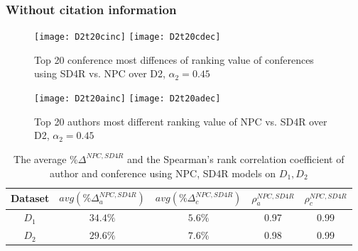 \documentclass[10pt,leqno,twoside]{article}
\begin{document}
\subsubsection{Without citation information}
\begin{figure} %
	\caption{Top 20 conference most diffences of ranking value of conferences using SD4R vs. NPC over D2, $\alpha_2=0.45$}
	\label{Fig:Top20IncDecConference}
    \centering
    \texttt{[image: D2t20cinc]}
     \texttt{[image: D2t20cdec]}
\end{figure}
%
\begin{figure} %
	\caption{Top 20 authors most different ranking value of NPC vs. SD4R over D2, $\alpha_2=0.45$}
	\label{Fig:Top20IncDecAuthor}
    \centering
    \texttt{[image: D2t20ainc]}
    \texttt{[image: D2t20adec]}
\end{figure}
%
\begin{table}
\begin{center}
\caption{The average $\%\Delta^{NPC,SD4R}$ and the Spearman's rank correlation coefficient of author and conference using NPC, SD4R models on $D_1, D_2$}
\label{fig:deltaresult}
{\scriptsize
\begin{tabular}{|c|c|c|c|c|}
\hline
Dataset	& $avg(\%\Delta^{NPC,SD4R}_a)$ & $avg(\%\Delta^{NPC,SD4R}_c)$ & $\rho^{NPC,SD4R}_a$ & $\rho^{NPC,SD4R}_c$ \\
\hline\hline
$D_1$ &	$34.4\%$ & $5.6\%$ & 0.97 & 0.99 \\
$D_2$ & $29.6\%$ & $7.6\%$ & 0.98 & 0.99 \\
\hline
\end{tabular}
}
\end{center}
\end{table}
%
%
\end{document}
